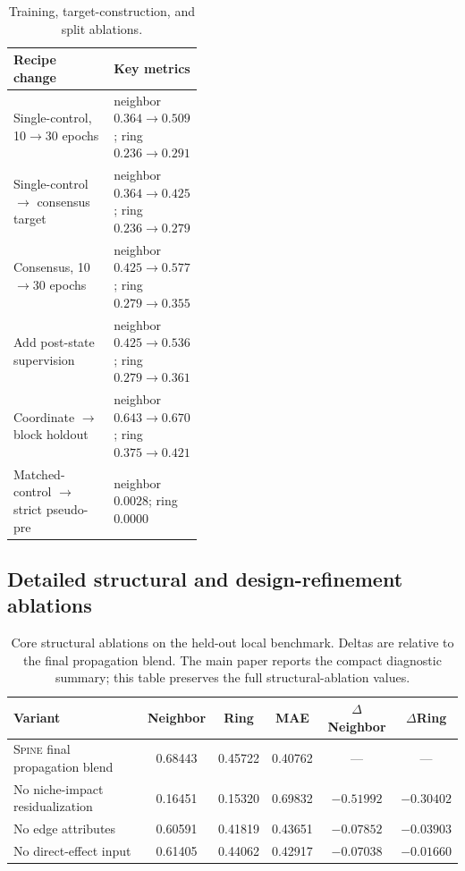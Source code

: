 \documentclass[sigconf,review,balance=false]{acmart}
\newcommand{\methodname}{\textsc{Spine}\xspace}
\begin{document}
\begin{table}[t]
\centering
\caption{Training, target-construction, and split ablations.}
\label{tab:app_ablation_recipe}
\footnotesize
\setlength{\tabcolsep}{4pt}
\renewcommand{\arraystretch}{1.14}
\begin{tabularx}{\linewidth}{@{}>{\raggedright\arraybackslash}X>{\raggedright\arraybackslash}p{0.42\linewidth}@{}}
\toprule
Recipe change & Key metrics \\
\midrule
Single-control, 10$\rightarrow$30 epochs & neighbor $0.364\rightarrow0.509$; ring $0.236\rightarrow0.291$ \\
Single-control $\rightarrow$ consensus target & neighbor $0.364\rightarrow0.425$; ring $0.236\rightarrow0.279$ \\
Consensus, 10$\rightarrow$30 epochs & neighbor $0.425\rightarrow0.577$; ring $0.279\rightarrow0.355$ \\
Add post-state supervision & neighbor $0.425\rightarrow0.536$; ring $0.279\rightarrow0.361$ \\
Coordinate $\rightarrow$ block holdout & neighbor $0.643\rightarrow0.670$; ring $0.375\rightarrow0.421$ \\
Matched-control $\rightarrow$ strict pseudo-pre & neighbor $0.0028$; ring $0.0000$ \\
\bottomrule
\end{tabularx}
\end{table}

\subsection{Detailed structural and design-refinement ablations}
\label{app:structural_design_refinement}

\begin{table}[t]
\centering
\caption{Core structural ablations on the held-out local benchmark. Deltas are relative to the final propagation blend. The main paper reports the compact diagnostic summary; this table preserves the full structural-ablation values.}
\label{tab:app_core_structural_ablations}
\small
\setlength{\tabcolsep}{5pt}
\renewcommand{\arraystretch}{1.12}
\begin{tabularx}{\textwidth}{@{}>{\raggedright\arraybackslash}Xccccc@{}}
\toprule
Variant & Neighbor & Ring & MAE & $\Delta$Neighbor & $\Delta$Ring \\
\midrule
\rowcolor{cyan!10}
\methodname{} final propagation blend &
0.68443 & 0.45722 & 0.40762 & --- & --- \\

No niche-impact residualization &
0.16451 & 0.15320 & 0.69832 & $-0.51992$ & $-0.30402$ \\

No edge attributes &
0.60591 & 0.41819 & 0.43651 & $-0.07852$ & $-0.03903$ \\

No direct-effect input &
0.61405 & 0.44062 & 0.42917 & $-0.07038$ & $-0.01660$ \\
\bottomrule
\end{tabularx}
\end{table}
\end{document}
